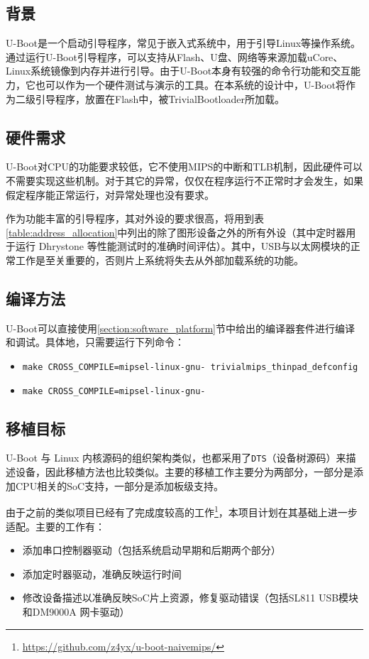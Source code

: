 \subsection{背景}
U-Boot是一个启动引导程序，常见于嵌入式系统中，用于引导Linux等操作系统。通过运行U-Boot引导程序，可以支持从Flash、U盘、网络等来源加载uCore、Linux系统镜像到内存并进行引导。由于U-Boot本身有较强的命令行功能和交互能力，它也可以作为一个硬件测试与演示的工具。在本系统的设计中，U-Boot将作为二级引导程序，放置在Flash中，被TrivialBootloader所加载。

\subsection{硬件需求}

U-Boot对CPU的功能要求较低，它不使用MIPS的中断和TLB机制，因此硬件可以不需要实现这些机制。对于其它的异常，仅仅在程序运行不正常时才会发生，如果假定程序能正常运行，对异常处理也没有要求。

作为功能丰富的引导程序，其对外设的要求很高，将用到表\ref{table:address_allocation}中列出的除了图形设备之外的所有外设（其中定时器用于运行 Dhrystone 等性能测试时的准确时间评估）。其中，USB与以太网模块的正常工作是至关重要的，否则片上系统将失去从外部加载系统的功能。

\subsection{编译方法}

U-Boot可以直接使用\ref{section:software_platform}节中给出的编译器套件进行编译和调试。具体地，只需要运行下列命令：

\begin{itemize}
    \item \texttt{make\ CROSS\_COMPILE=mipsel-linux-gnu- trivialmips\_thinpad\_defconfig}
    \item \texttt{make CROSS\_COMPILE=mipsel-linux-gnu- }
\end{itemize}

\subsection{移植目标}

U-Boot 与 Linux 内核源码的组织架构类似，也都采用了\texttt{DTS}（设备树源码）来描述设备，因此移植方法也比较类似。主要的移植工作主要分为两部分，一部分是添加CPU相关的SoC支持，一部分是添加板级支持。

由于之前的类似项目已经有了完成度较高的工作\footnote{\url{https://github.com/z4yx/u-boot-naivemips/}}，本项目计划在其基础上进一步适配。主要的工作有：

\begin{itemize}
    \item 添加串口控制器驱动（包括系统启动早期和后期两个部分）
    \item 添加定时器驱动，准确反映运行时间
    \item 修改设备描述以准确反映SoC片上资源，修复驱动错误（包括SL811 USB模块和DM9000A 网卡驱动）
\end{itemize}